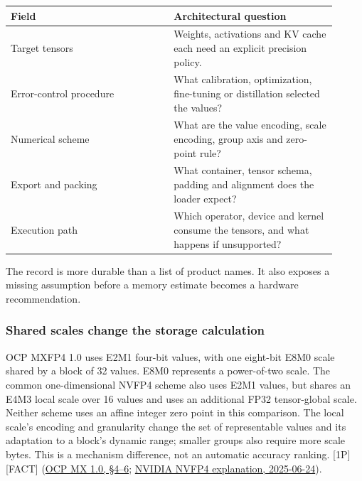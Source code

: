 \nopagebreak[4]
\begin{longtable}[]{@{}
  >{\raggedright\arraybackslash}p{0.4527\linewidth}
  >{\raggedright\arraybackslash}p{0.4527\linewidth}@{}}
\toprule\noalign{}
\begin{minipage}[b]{\linewidth}\raggedright
Field
\end{minipage} & \begin{minipage}[b]{\linewidth}\raggedright
Architectural question
\end{minipage} \\
\midrule\noalign{}
\endhead
\bottomrule\noalign{}
\endlastfoot
Target tensors & Weights, activations and KV cache each need an explicit
precision policy. \\
\noalign{\label{tab:7.4}}
Error-control procedure & What calibration, optimization, fine-tuning or
distillation selected the values? \\
Numerical scheme & What are the value encoding, scale encoding, group
axis and zero-point rule? \\
Export and packing & What container, tensor schema, padding and
alignment does the loader expect? \\
Execution path & Which operator, device and kernel consume the tensors,
and what happens if unsupported? \\
\end{longtable}

The record is more durable than a list of product names. It also exposes
a missing assumption before a memory estimate becomes a hardware
recommendation.

\subsubsection{Shared scales change the storage
calculation}\label{shared-scales-change-the-storage-calculation}

OCP MXFP4 1.0 uses E2M1 four-bit values, with one eight-bit E8M0 scale
shared by a block of 32 values. E8M0 represents a power-of-two scale.
The common one-dimensional NVFP4 scheme also uses E2M1 values, but
shares an E4M3 local scale over 16 values and uses an additional FP32
tensor-global scale. Neither scheme uses an affine integer zero point in
this comparison. The local scale's encoding and granularity change the
set of representable values and its adaptation to a block's dynamic
range; smaller groups also require more scale bytes. This is a mechanism
difference, not an automatic accuracy ranking. \mbox{{[}1P{]}}\hspace{0pt}\mbox{{[}FACT{]}}
(\href{https://www.opencompute.org/documents/ocp-microscaling-formats-mx-v1-0-spec-final-pdf}{OCP
MX 1.0, §4--6};
\href{https://developer.nvidia.com/blog/introducing-nvfp4-for-efficient-and-accurate-low-precision-inference/}{NVIDIA
NVFP4 explanation, 2025-06-24}).

